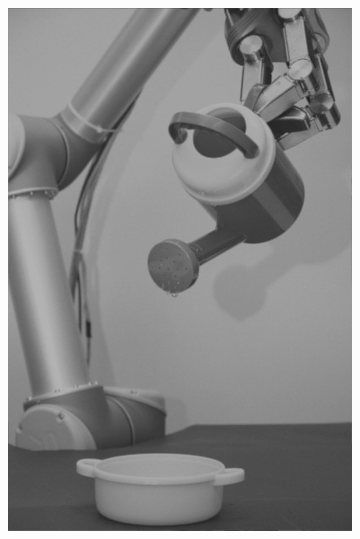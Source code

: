 \begin{figure}[H]
\begin{subfigure}[b]{0.1\textwidth}
        \includegraphics[width=\textwidth]{img3/test/contrast_5_0_7_final_img3.png}
    \end{subfigure}
    \begin{subfigure}[b]{0.1\textwidth}

\end{subfigure}
\end{figure}
